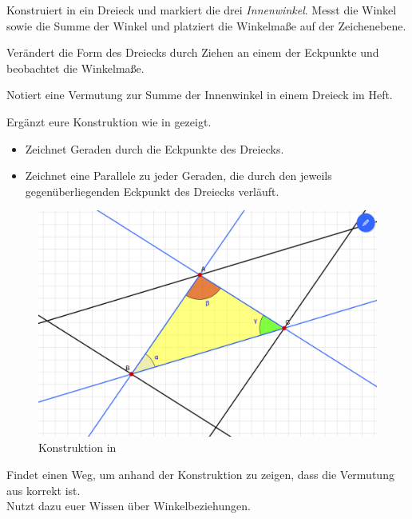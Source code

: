 \documentclass[11pt, a4paper]{arbeitsblatt}
\begin{document}
\ReiheTitel

\begin{aufgabe}[icon=\iconTablet\,\iconPartner]
	\label{aufg:vermutung-aufstellen}
	Konstruiert in  ein Dreieck und markiert die drei
	\emph{Innenwinkel}. Messt die Winkel sowie die Summe der Winkel und platziert
	die Winkelmaße auf der Zeichenebene.

	Verändert die Form des Dreiecks durch Ziehen an einem der Eckpunkte und
	beobachtet die Winkelmaße.


	Notiert eine Vermutung zur Summe der Innenwinkel in einem Dreieck im Heft.
\end{aufgabe}

\begin{wrapfix}
\begin{figure}
\end{figure}
\begin{aufgabe}[icon=\iconTablet\,\iconPartner]
	\label{aufg:konstruktion}
	Ergänzt eure Konstruktion wie in  gezeigt.

	\begin{itemize}
		\item Zeichnet Geraden durch die Eckpunkte des Dreiecks.
		\item Zeichnet eine Parallele zu jeder Geraden, die durch den jeweils gegenüberliegenden
		Eckpunkt des Dreiecks verläuft.
	\end{itemize}

\begin{figure}[h]\centering
	\includegraphics[width=.4\linewidth]{Jg.7-AB.02-Abb_Konstruktion.jpeg}
	\caption{Konstruktion in }\label{abb:konstruktion}
\end{figure}
\end{aufgabe}
\end{wrapfix}

\begin{wrapfix}
\begin{figure}
\end{figure}
\begin{aufgabe}[icon=\iconTablet\,\iconPartner]
	\label{aufg:vermutung-beweisen}
	Findet einen Weg, um anhand der Konstruktion zu zeigen, dass die Vermutung
	aus  korrekt ist. \\
	Nutzt dazu euer Wissen über Winkelbeziehungen.
\end{aufgabe}
\end{wrapfix}
\end{document}
